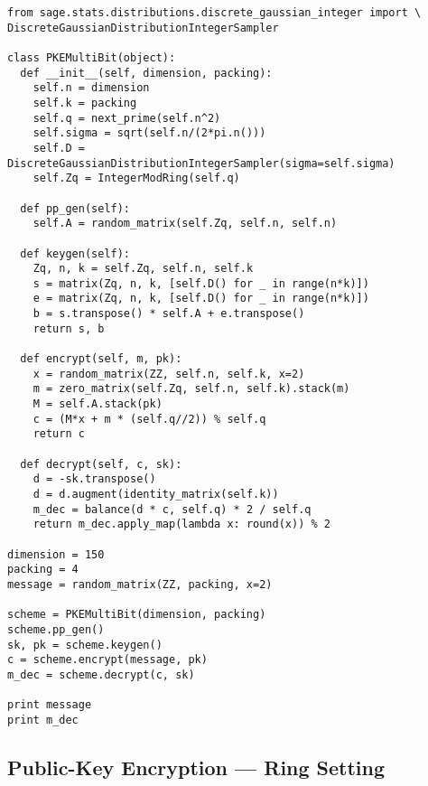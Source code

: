 \documentclass[10pt,a4paper,nobib]{tufte-handout}
\begin{document}
\lstset{language=sage,label= ,caption= ,captionpos=b,numbers=none}
\begin{lstlisting}
from sage.stats.distributions.discrete_gaussian_integer import \
DiscreteGaussianDistributionIntegerSampler

class PKEMultiBit(object):
  def __init__(self, dimension, packing):
    self.n = dimension
    self.k = packing
    self.q = next_prime(self.n^2)
    self.sigma = sqrt(self.n/(2*pi.n()))
    self.D = DiscreteGaussianDistributionIntegerSampler(sigma=self.sigma)
    self.Zq = IntegerModRing(self.q)

  def pp_gen(self):
    self.A = random_matrix(self.Zq, self.n, self.n)

  def keygen(self):
    Zq, n, k = self.Zq, self.n, self.k
    s = matrix(Zq, n, k, [self.D() for _ in range(n*k)])
    e = matrix(Zq, n, k, [self.D() for _ in range(n*k)])
    b = s.transpose() * self.A + e.transpose()
    return s, b

  def encrypt(self, m, pk):
    x = random_matrix(ZZ, self.n, self.k, x=2)
    m = zero_matrix(self.Zq, self.n, self.k).stack(m)
    M = self.A.stack(pk)
    c = (M*x + m * (self.q//2)) % self.q
    return c

  def decrypt(self, c, sk):
    d = -sk.transpose()
    d = d.augment(identity_matrix(self.k))
    m_dec = balance(d * c, self.q) * 2 / self.q
    return m_dec.apply_map(lambda x: round(x)) % 2

dimension = 150
packing = 4
message = random_matrix(ZZ, packing, x=2)

scheme = PKEMultiBit(dimension, packing)
scheme.pp_gen()
sk, pk = scheme.keygen()
c = scheme.encrypt(message, pk)
m_dec = scheme.decrypt(c, sk)

print message
print m_dec
\end{lstlisting}

\subsection{Public-Key Encryption --- Ring Setting}
\end{document}
